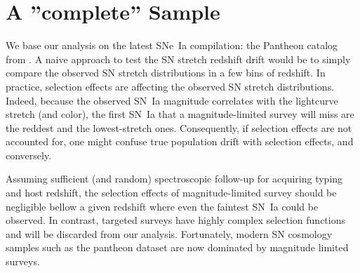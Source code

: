 \documentclass[]{aa} %
\newcommand{\nn}[1]{{\textcolor[rgb]{1, 0.27, 0}{#1}}}
\begin{document}

\section{A ''complete'' Sample}
\label{sec:sample}

We base our analysis on the latest SNe~Ia compilation: the Pantheon catalog from
\cite{scolnic2018a}.  A naive approach to test the SN stretch redshift drift
would be to simply compare the observed SN stretch distributions in a few bins
of redshift.  In practice, selection effects are affecting the observed SN
stretch distributions. Indeed, because the observed SN~Ia magnitude correlates
with the lightcurve stretch (and color), the first SN~Ia that a
magnitude-limited survey will miss are the reddest and the lowest-stretch ones.
Consequently, if selection effects are not accounted for, one might confuse true
population drift with selection effects, and conversely.

\nn{Assuming} sufficient (and random) spectroscopic follow-up for acquiring
typing and host redshift, the selection effects of magnitude-limited survey
should be negligible bellow a given redshift where even the faintest \nn{SN~Ia}
could be observed. In contrast, targeted surveys have highly complex selection
functions and will be discarded from our analysis. Fortunately, modern SN
cosmology samples such as the pantheon dataset are now dominated by magnitude
limited surveys.
\end{document}
